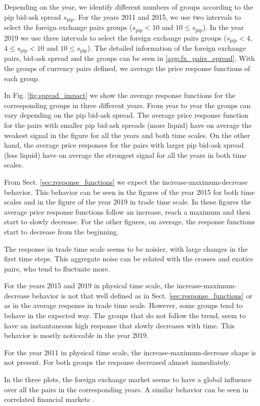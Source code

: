 Depending on the year, we identify different numbers of groups according to the
pip bid-ask spread $s_{\textrm{pip}}$. For the years 2011 and 2015, we use two
intervals to select the foreign exchange pairs groups ($s_{\textrm{pip}}<10$
and $10 \le s_{\textrm{pip}}$). In the year 2019 we use three intervals to
select the foreign exchange pairs groups ($s_{\textrm{pip}}<4$,
$4 \le s_{\textrm{pip}} < 10$ and $10 \le s_{\textrm{pip}}$). The detailed
information of the foreign exchange pairs, bid-ask spread and the groups can be
seen in \ref{app:fx_pairs_spread}. With the groups of currency pairs defined, we
average the price response functions of each group.

In Fig. \ref{fig:spread_impact} we show the average response functions for
the corresponding groups in three different years. From year to year the groups
can vary depending on the pip bid-ask spread. The average price response
function for the pairs with smaller pip bid-ask spreads (more liquid) have on
average the weakest signal in the figure for all the years and both time
scales. On the other hand, the average price responses for the pairs with
larger pip bid-ask spread (less liquid) have on average the strongest signal
for all the years in both time scales.

From Sect. \ref{sec:response_functions} we expect the increase-maximum-decrease
behavior. This behavior can be seen in the figures of the year 2015 for both
time scales and in the figure of the year 2019 in trade time scale. In these
figures the average price response functions follow an increase, reach a
maximum and then start to slowly decrease. For the other figures, on average,
the response functions start to decrease from the beginning.

The response in trade time scale seems to be noisier, with large changes in the
first time steps. This aggregate noise can be related with the crosses and
exotics pairs, who tend to fluctuate more.

For the years 2015 and 2019 in physical time scale, the
increase-maximum-decrease behavior is not that well defined as in Sect.
\ref{sec:response_functions} or as in the average response in trade time scale.
However, some groups tend to behave in the expected way. The groups that do not
follow the trend, seem to have an instantaneous high response that slowly
decreases with time. This behavior is mostly noticeable in the year 2019.

For the year 2011 in physical time scale, the increase-maximum-decrease shape
is not present. For both groups the response decreased almost immediately.

In the three plots, the foreign exchange market seems to have a global
influence over all the pairs in the corresponding years. A similar behavior
can be seen in correlated financial markets
\cite{my_paper_response_financial}.